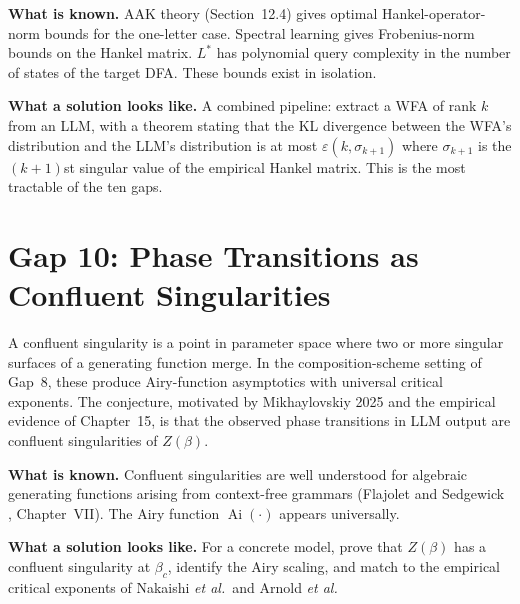 \textbf{What is known.} AAK theory (Section~12.4) gives optimal Hankel-operator-norm bounds for the one-letter case. Spectral learning gives Frobenius-norm bounds on the Hankel matrix. $L^*$ has polynomial query complexity in the number of states of the target DFA. These bounds exist in isolation.

\textbf{What a solution looks like.} A combined pipeline: extract a WFA of rank $k$ from an LLM, with a theorem stating that the KL divergence between the WFA's distribution and the LLM's distribution is at most $\varepsilon(k,\sigma_{k+1})$ where $\sigma_{k+1}$ is the $(k+1)$st singular value of the empirical Hankel matrix. This is the most tractable of the ten gaps.

\section{Gap 10: Phase Transitions as Confluent Singularities}
\label{ch18:gap10}

A confluent singularity is a point in parameter space where two or more singular surfaces of a generating function merge. In the composition-scheme setting of Gap~8, these produce Airy-function asymptotics with universal critical exponents. The conjecture, motivated by Mikhaylovskiy 2025 \cite{Mikhaylovskiy2025} and the empirical evidence of Chapter~15, is that the observed phase transitions in LLM output are confluent singularities of $Z(\beta)$.

\textbf{What is known.} Confluent singularities are well understood for algebraic generating functions arising from context-free grammars (Flajolet and Sedgewick \cite{FlajoletSedgewick2009}, Chapter~VII). The Airy function $\operatorname{Ai}(\cdot)$ appears universally.

\textbf{What a solution looks like.} For a concrete model, prove that $Z(\beta)$ has a confluent singularity at $\beta_c$, identify the Airy scaling, and match to the empirical critical exponents of Nakaishi \emph{et al.}\ and Arnold \emph{et al.}

